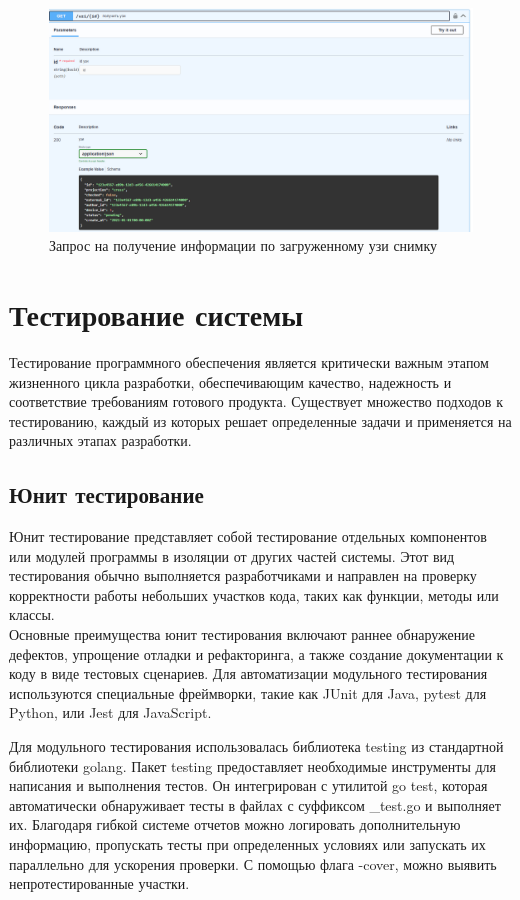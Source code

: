 \begin{figure}[H]%
	\begin{center}
		\includegraphics[width=.6\columnwidth]{./img/new/uzi_response.png}%
	\end{center}
	\caption{Запрос на получение информации по загруженному узи снимку}%
	\label{pic:uzi_response}%
\end{figure}

\section{Тестирование системы}
Тестирование программного обеспечения является критически важным этапом жизненного цикла разработки, 
обеспечивающим качество, надежность и соответствие требованиям готового продукта. Существует множество 
подходов к тестированию, каждый из которых решает определенные задачи и применяется на различных этапах 
разработки.

\subsection{Юнит тестирование}
Юнит тестирование представляет собой тестирование отдельных компонентов или модулей программы в изоляции 
от других частей системы. Этот вид тестирования обычно выполняется разработчиками и направлен на проверку 
корректности работы небольших участков кода, таких как функции, методы или классы.\\
Основные преимущества юнит тестирования включают раннее обнаружение дефектов, упрощение 
отладки и рефакторинга, а также создание документации к коду в виде тестовых сценариев. 
Для автоматизации модульного тестирования используются специальные фреймворки, 
такие как JUnit для Java, pytest для Python, или Jest для JavaScript.

Для модульного тестирования использовалась библиотека testing из стандартной библиотеки golang.
Пакет testing предоставляет необходимые инструменты для написания и выполнения тестов. 
Он интегрирован с утилитой go test, которая автоматически обнаруживает тесты в файлах с суффиксом \_test.go 
и выполняет их. Благодаря гибкой системе отчетов можно логировать дополнительную информацию, пропускать тесты при определенных условиях или запускать их параллельно для ускорения проверки.
С помощью флага -cover, можно выявить непротестированные участки.

